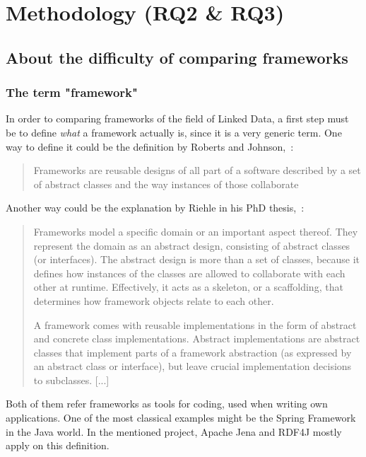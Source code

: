 \chapter{Methodology (RQ2 \& RQ3)}
\section{About the difficulty of comparing frameworks}\label{def:framework}

\subsection{The term "framework"}

In order to comparing frameworks of the field of Linked Data, a first step must be to define \emph{what} a framework actually is, since it is a very generic term. One way to define it could be the definition by Roberts and Johnson,~\cite{roberts1996evolving}:

\begin{quotation}
Frameworks are reusable designs of all part of a software described by a set of abstract classes and the way instances of those collaborate
\end{quotation}

Another way could be the explanation by Riehle in his PhD thesis,~\cite{riehle2000framework}:

\begin{quotation}
Frameworks model a specific domain or an important aspect thereof. They represent the domain as an abstract design, consisting of abstract classes (or interfaces). The abstract design is more than a set of classes, because it defines how instances of the classes are allowed to collaborate with each other at runtime. Effectively, it acts as a skeleton, or a scaffolding, that determines how framework objects relate to each other.

A framework comes with reusable implementations in the form of abstract and concrete class implementations. Abstract implementations are abstract classes that implement parts of a framework abstraction (as expressed by an abstract class or interface), but leave crucial implementation decisions to subclasses. [...]
\end{quotation}

Both of them refer frameworks as tools for coding, used when writing own applications. One of the most classical examples might be the Spring Framework in the Java world. In the mentioned project, Apache Jena and RDF4J mostly apply on this definition.

